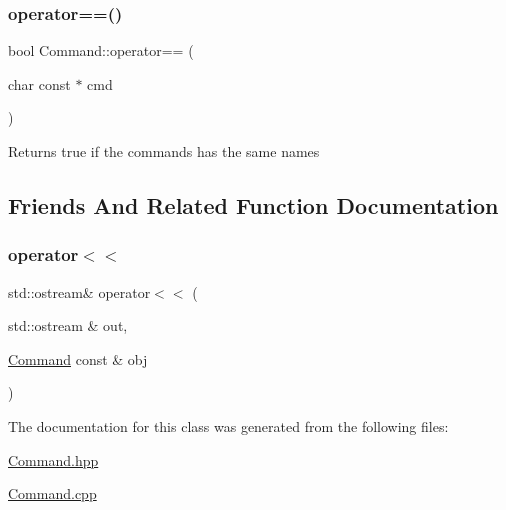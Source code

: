 \mbox{\label{classCommand_a75d6d67687c9d29e47ce9e80540bbd1e}} 
\subsubsection{\texorpdfstring{operator==()}{operator==()}}
{\footnotesize\ttfamily bool Command\+::operator== (\begin{DoxyParamCaption}\item[{char const $\ast$}]{cmd }\end{DoxyParamCaption})}

\begin{DoxyReturn}{Returns}
true if the commands has the same names 
\end{DoxyReturn}


\subsection{Friends And Related Function Documentation}
\mbox{\label{classCommand_a0a193e228644a3735c309d8b2b5b9899}} 
\subsubsection{\texorpdfstring{operator$<$$<$}{operator<<}}
{\footnotesize\ttfamily std\+::ostream\& operator$<$$<$ (\begin{DoxyParamCaption}\item[{std\+::ostream \&}]{out,  }\item[{\hyperlink{classCommand}{Command} const \&}]{obj }\end{DoxyParamCaption})\hspace{0.3cm}{\ttfamily [friend]}}



The documentation for this class was generated from the following files\+:\begin{DoxyCompactItemize}
\item 
\hyperlink{Command_8hpp}{Command.\+hpp}\item 
\hyperlink{Command_8cpp}{Command.\+cpp}\end{DoxyCompactItemize}
